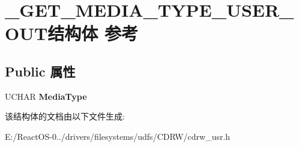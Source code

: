 \hypertarget{struct___g_e_t___m_e_d_i_a___t_y_p_e___u_s_e_r___o_u_t}{}\section{\+\_\+\+G\+E\+T\+\_\+\+M\+E\+D\+I\+A\+\_\+\+T\+Y\+P\+E\+\_\+\+U\+S\+E\+R\+\_\+\+O\+U\+T结构体 参考}
\label{struct___g_e_t___m_e_d_i_a___t_y_p_e___u_s_e_r___o_u_t}
\subsection*{Public 属性}
\begin{DoxyCompactItemize}
\item 
\mbox{\label{struct___g_e_t___m_e_d_i_a___t_y_p_e___u_s_e_r___o_u_t_aa2a49e7feaf17847c177f10fd7e25058}} 
U\+C\+H\+AR {\bfseries Media\+Type}
\end{DoxyCompactItemize}


该结构体的文档由以下文件生成\+:\begin{DoxyCompactItemize}
\item 
E\+:/\+React\+O\+S-\/0../drivers/filesystems/udfs/\+C\+D\+R\+W/cdrw\+\_\+usr.\+h\end{DoxyCompactItemize}
